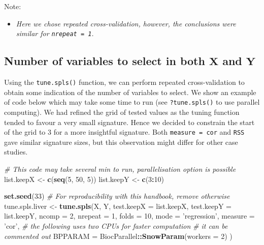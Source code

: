 \documentclass[]{book}
\newenvironment{Shaded}{\begin{snugshade}}{\end{snugshade}}
\newcommand{\CommentTok}[1]{\textcolor[rgb]{0.56,0.35,0.01}{\textit{#1}}}
\newcommand{\DataTypeTok}[1]{\textcolor[rgb]{0.13,0.29,0.53}{#1}}
\newcommand{\DecValTok}[1]{\textcolor[rgb]{0.00,0.00,0.81}{#1}}
\newcommand{\KeywordTok}[1]{\textcolor[rgb]{0.13,0.29,0.53}{\textbf{#1}}}
\newcommand{\NormalTok}[1]{#1}
\newcommand{\OperatorTok}[1]{\textcolor[rgb]{0.81,0.36,0.00}{\textbf{#1}}}
\newcommand{\StringTok}[1]{\textcolor[rgb]{0.31,0.60,0.02}{#1}}
\providecommand{\tightlist}{%
  \setlength{\itemsep}{0pt}\setlength{\parskip}{0pt}}
\begin{document}
Note:

\begin{itemize}
\tightlist
\item
  \emph{Here we chose repeated cross-validation, however, the conclusions were similar for \texttt{nrepeat\ =\ 1}.}
\end{itemize}

\hypertarget{number-of-variables-to-select-in-both-boldsymbol-x-and-boldsymbol-y}{%
\subsection{\texorpdfstring{Number of variables to select in both \(\boldsymbol X\) and \(\boldsymbol Y\)}{Number of variables to select in both \textbackslash{}boldsymbol X and \textbackslash{}boldsymbol Y}}\label{number-of-variables-to-select-in-both-boldsymbol-x-and-boldsymbol-y}}

Using the \texttt{tune.spls()} function, we can perform repeated cross-validation to obtain some indication of the number of variables to select. We show an example of code below which may take some time to run (see \texttt{?tune.spls()} to use parallel computing). We had refined the grid of tested values as the tuning function tended to favour a very small signature. Hence we decided to constrain the start of the grid to 3 for a more insightful signature. Both \texttt{measure\ =\ \textquotesingle{}cor\textquotesingle{}} and \texttt{RSS} gave similar signature sizes, but this observation might differ for other case studies.

\begin{Shaded}
\begin{Highlighting}[]
\CommentTok{# This code may take several min to run, parallelisation option is possible}
\NormalTok{list.keepX <-}\StringTok{ }\KeywordTok{c}\NormalTok{(}\KeywordTok{seq}\NormalTok{(}\DecValTok{5}\NormalTok{, }\DecValTok{50}\NormalTok{, }\DecValTok{5}\NormalTok{))}
\NormalTok{list.keepY <-}\StringTok{ }\KeywordTok{c}\NormalTok{(}\DecValTok{3}\OperatorTok{:}\DecValTok{10}\NormalTok{)}

\KeywordTok{set.seed}\NormalTok{(}\DecValTok{33}\NormalTok{)  }\CommentTok{# For reproducibility with this handbook, remove otherwise}
\NormalTok{tune.spls.liver <-}\StringTok{ }\KeywordTok{tune.spls}\NormalTok{(X, Y, }\DataTypeTok{test.keepX =}\NormalTok{ list.keepX, }
                             \DataTypeTok{test.keepY =}\NormalTok{ list.keepY, }\DataTypeTok{ncomp =} \DecValTok{2}\NormalTok{, }
                             \DataTypeTok{nrepeat =} \DecValTok{1}\NormalTok{, }\DataTypeTok{folds =} \DecValTok{10}\NormalTok{, }\DataTypeTok{mode =} \StringTok{'regression'}\NormalTok{, }
                             \DataTypeTok{measure =} \StringTok{'cor'}\NormalTok{, }
                            \CommentTok{#   the following uses two CPUs for faster computation}
                            \CommentTok{# it can be commented out}
                            \DataTypeTok{BPPARAM =}\NormalTok{ BiocParallel}\OperatorTok{::}\KeywordTok{SnowParam}\NormalTok{(}\DataTypeTok{workers =} \DecValTok{2}\NormalTok{)}
\NormalTok{                            )}
\end{Highlighting}
\end{Shaded}
\end{document}
